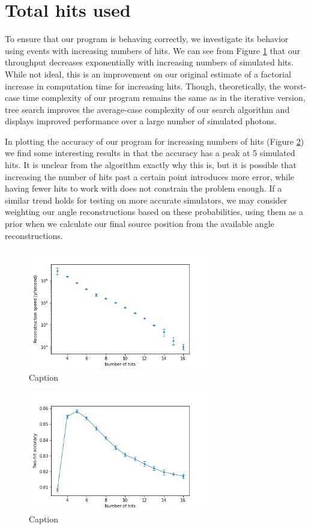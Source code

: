 \section{Total hits used}
\label{totalhits}
To ensure that our program is behaving correctly, we investigate its behavior using events with increasing numbers of hits. We can see from Figure \ref{fig:hits_speed} that our throughput decreases exponentially with increasing numbers of simulated hits. While not ideal, this is an improvement on our original estimate of a factorial increase in computation time for increasing hits. Though, theoretically, the worst-case time complexity of our program remains the same as in the iterative version, tree search improves the average-case complexity of our search algorithm and displays improved performance over a large number of simulated photons.

In plotting the accuracy of our program for increasing numbers of hits (Figure \ref{fig:hits_acc}) we find some interesting results in that the accuracy has a peak at 5 simulated hits. It is unclear from the algorithm exactly why this is, but it is possible that increasing the number of hits past a certain point introduces more error, while having fewer hits to work with does not constrain the problem enough. If a similar trend holds for testing on more accurate simulators, we may consider weighting our angle reconstructions based on these probabilities, using them as a prior when we calculate our final source position from the available angle reconstructions.

\begin{figure}
    \centering
    \includegraphics[width=0.7\textwidth]{graphs/pi_hits_speed.png}
    \caption{Caption}
    \label{fig:hits_speed}
\end{figure}

\begin{figure}
    \centering
    \includegraphics[width=0.7\textwidth]{graphs/pi_hits_acc.png}
    \caption{Caption}
    \label{fig:hits_acc}
\end{figure}

